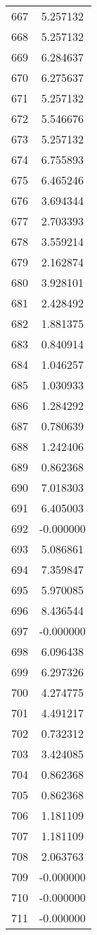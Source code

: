 \documentclass[12pt]{article}
\begin{document}
\begin{longtable}{@{}cc@{}}
667 & 5.257132 \\
668 & 5.257132 \\
669 & 6.284637 \\
670 & 6.275637 \\
671 & 5.257132 \\
672 & 5.546676 \\
673 & 5.257132 \\
674 & 6.755893 \\
675 & 6.465246 \\
676 & 3.694344 \\
677 & 2.703393 \\
678 & 3.559214 \\
679 & 2.162874 \\
680 & 3.928101 \\
681 & 2.428492 \\
682 & 1.881375 \\
683 & 0.840914 \\
684 & 1.046257 \\
685 & 1.030933 \\
686 & 1.284292 \\
687 & 0.780639 \\
688 & 1.242406 \\
689 & 0.862368 \\
690 & 7.018303 \\
691 & 6.405003 \\
692 & -0.000000 \\
693 & 5.086861 \\
694 & 7.359847 \\
695 & 5.970085 \\
696 & 8.436544 \\
697 & -0.000000 \\
698 & 6.096438 \\
699 & 6.297326 \\
700 & 4.274775 \\
701 & 4.491217 \\
702 & 0.732312 \\
703 & 3.424085 \\
704 & 0.862368 \\
705 & 0.862368 \\
706 & 1.181109 \\
707 & 1.181109 \\
708 & 2.063763 \\
709 & -0.000000 \\
710 & -0.000000 \\
711 & -0.000000 \\

\end{longtable}
\end{document}
